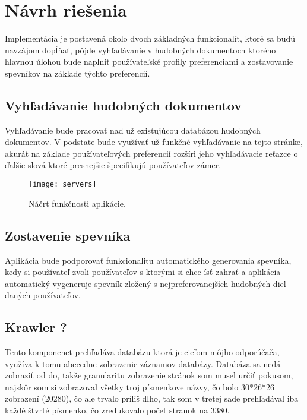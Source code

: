 \newpage

\section{Návrh riešenia}

Implementácia je postavená okolo dvoch základných funkcionalít, ktoré sa budú navzájom dopĺňať, pôjde vyhľadávanie v hudobných dokumentoch ktorého hlavnou úlohou bude naplniť používateľské profily preferenciami a zostavovanie spevníkov na základe týchto preferencií. 

\subsection{Vyhľadávanie hudobných dokumentov}

Vyhľadávanie bude pracovať nad už existujúcou databázou hudobných dokumentov. V podstate bude využívať už funkčné vyhľadávanie na tejto stránke, akurát na základe používateľových preferencií rozšíri jeho vyhľadávacie reťazce o ďalšie slová ktoré presnejšie špecifikujú používateľov zámer.

\begin{figure}\begin{center}\texttt{[image: servers]}
\caption{Náčrt funkčnosti aplikácie.}\label{Náčrt funkčnosti aplikácie}
\end{center}\end{figure}

\subsection{Zostavenie spevníka}

Aplikácia bude podporovať funkcionalitu automatického generovania spevníka, kedy si používateľ zvoli používateľov s ktorými si chce ísť zahrať a aplikácia automatický vygeneruje spevník zložený s nejpreferovanejších hudobných diel daných používateľov.

\subsection{Krawler ?}

Tento komponenet prehľadáva databázu ktorá je cieľom môjho odporúčača,
využíva k tomu abecedne zobrazenie záznamov databázy.
Databáza sa nedá zobraziť od do,
takže granularitu zobrazenie stránok som musel určiť pokusom,
najskôr som si zobrazoval všetky troj písmenkove názvy,
čo bolo 30*26*26 zobrazení (20280), čo ale trvalo príliš dlho,
tak som v tretej sade prehľadával iba každé štvrté písmenko, čo zredukovalo počet stranok na 3380.

